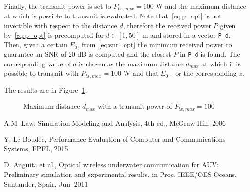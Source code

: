 \documentclass[10pt]{article}
\begin{document}
Finally, the transmit power is set to $P_{tx, max} = 100$ W and the maximum distance at which is possible to transmit is evaluated. Note that~\eqref{eq:p_opt} is not invertible with respect to the distance $d$, therefore the received power $P$ given by~\eqref{eq:p_opt} is precomputed for $d \in [0, 50]$ m and stored in a vector \texttt{P\_d}. Then, given a certain $E_0$, from~\eqref{eq:snr_opt} the minimum received power to guarantee an SNR of 20 dB is computed and the closest $P$ in \texttt{P\_d} is found. The corresponding value of $d$ is chosen as the maximum distance $d_{max}$ at which it is possible to transmit with $P_{tx, max} = 100$ W and that $E_0$ - or the corresponding $z$.

The results are in Figure~\ref{fig:dmax}.

\begin{figure}[h!]
	\centering
	\caption{Maximum distance $d_{max}$ with a transmit power of $P_{tx, max} = 100$}
	\label{fig:dmax}
\end{figure}


\begin{thebibliography}{10}

A.M. Law, Simulation Modeling and Analysis, 4th ed., McGraw Hill, 2006

Y. Le Boudec, Performance Evaluation of Computer and Communications Systems, EPFL, 2015

D. Anguita et al., Optical wireless underwater communication for AUV: Preliminary simulation and experimental results, in Proc. IEEE/OES Oceans, Santander, Spain, Jun. 2011

\end{thebibliography}
\end{document}
